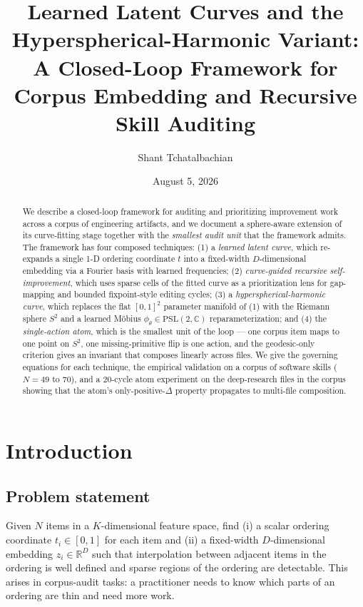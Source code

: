 \documentclass[11pt,a4paper]{article}
\title{Learned Latent Curves and the Hyperspherical-Harmonic Variant:\\
  {\large A Closed-Loop Framework for Corpus Embedding and Recursive Skill Auditing}}
\author{Shant Tchatalbachian}
\date{August 5, 2026}
\begin{document}
\maketitle

\begin{abstract}
We describe a closed-loop framework for auditing and prioritizing improvement work across a corpus of engineering artifacts, and we document a sphere-aware extension of its curve-fitting stage together with the \emph{smallest audit unit} that the framework admits. The framework has four composed techniques: (1) a \emph{learned latent curve}, which re-expands a single 1-D ordering coordinate $t$ into a fixed-width $D$-dimensional embedding via a Fourier basis with learned frequencies; (2) \emph{curve-guided recursive self-improvement}, which uses sparse cells of the fitted curve as a prioritization lens for gap-mapping and bounded fixpoint-style editing cycles; (3) a \emph{hyperspherical-harmonic curve}, which replaces the flat $[0,1]^2$ parameter manifold of (1) with the Riemann sphere $S^2$ and a learned M\"obius $\phi_\theta \in \mathrm{PSL}(2,\mathbb{C})$ reparameterization; and (4) the \emph{single-action atom}, which is the smallest unit of the loop --- one corpus item maps to one point on $S^2$, one missing-primitive flip is one action, and the geodesic-only criterion gives an invariant that composes linearly across files. We give the governing equations for each technique, the empirical validation on a corpus of software skills ($N = 49$ to $70$), and a 20-cycle atom experiment on the deep-research files in the corpus showing that the atom's only-positive-$\Delta$ property propagates to multi-file composition.
\end{abstract}

\section{Introduction}

\subsection{Problem statement}
Given $N$ items in a $K$-dimensional feature space, find (i) a scalar ordering coordinate $t_i \in [0,1]$ for each item and (ii) a fixed-width $D$-dimensional embedding $z_i \in \mathbb{R}^D$ such that interpolation between adjacent items in the ordering is well defined and sparse regions of the ordering are detectable. This arises in corpus-audit tasks: a practitioner needs to know which parts of an ordering are thin and need more work.
\end{document}
